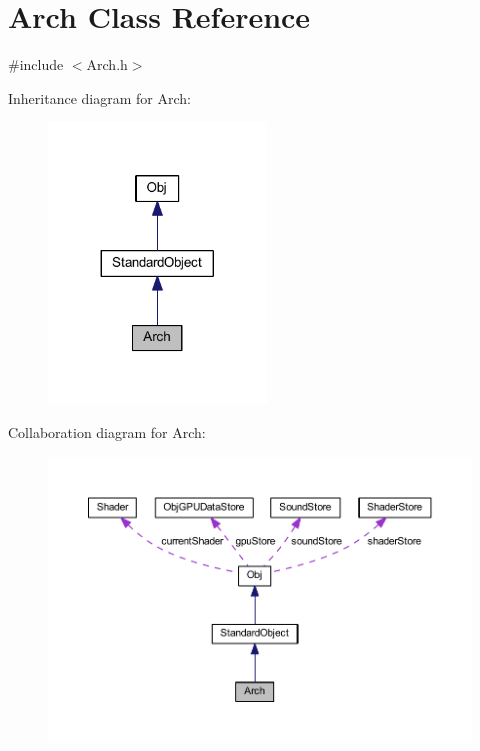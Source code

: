 \hypertarget{class_arch}{}\section{Arch Class Reference}
\label{class_arch}


{\ttfamily \#include $<$Arch.\+h$>$}



Inheritance diagram for Arch\+:
\nopagebreak
\begin{figure}[H]
\begin{center}
\leavevmode
\includegraphics[width=164pt]{class_arch__inherit__graph}
\end{center}
\end{figure}


Collaboration diagram for Arch\+:
\nopagebreak
\begin{figure}[H]
\begin{center}
\leavevmode
\includegraphics[width=350pt]{class_arch__coll__graph}
\end{center}
\end{figure}
